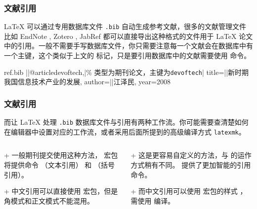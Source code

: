 \begin{frame}[fragile]
  \frametitle{文献引用}
  \LaTeX{} 可以通过专用数据库文件 \texttt{.bib} 自动生成参考文献，很多的文献管理文件比如 EndNote , Zotero , JabRef  都可以直接导出这种格式的文件用于 \LaTeX{} 论文中的引用。一般不需要手写数据库文件，你只需要注意每一个文献会在数据库中有一个主键，这个类似于上文的  标记，只是要引用数据库中的文献需要使用  命令。
  
  \begin{codeblock}[]{ref.bib}
|\highlightline|@article{devoftech,|\hfill\alert{\% 类型为期刊论文，主键为\texttt{devoftech}}|
  title={||新时期我国信息技术产业的发展},
  author={||江泽民},
  year={2008}
}
  \end{codeblock}
\end{frame}

\begin{frame}
  \frametitle{文献引用}
  而让 \LaTeX{} 处理 \texttt{.bib} 数据库文件与引用有两种工作流。你可能需要查清楚如何在编辑器中设置对应的工作流，或者采用后面所提到的高级编译方式 \texttt{latexmk}。
  \begin{columns}
    \begin{column}{0.5\textwidth}
      \begin{block}{ + }
        一般期刊提交使用这种方法， 宏包将提供命令 （文本引用） 和 （括号引用）。
      \end{block}
      \begin{alertblock}{ + }
        中文引用可以直接使用  宏包，但是角模式和正文模式不能混用。
      \end{alertblock}
    \end{column}
    \begin{column}{0.5\textwidth}
      \begin{block}{ + }
        这是更容易自定义的方法，与  的运作方式稍有不同。 提供了更加智能的引用命令。
      \end{block}
      \begin{alertblock}{ + }
        而中文引用可以使用  宏包的样式 ，需使用  编译。
      \end{alertblock}
    \end{column}
  \end{columns}
\end{frame}

